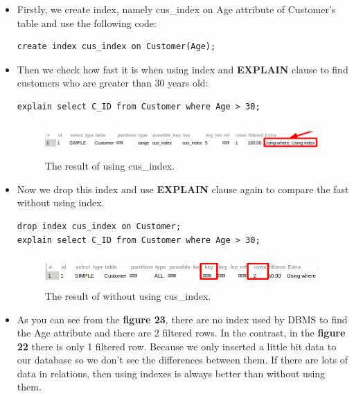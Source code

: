 \documentclass[12pt,a4paper]{article}
\begin{document}
\begin{itemize}
    \item Firstly, we create index, namely cus\_index on Age attribute of Customer's table and use the following code:
    \begin{verbatim}
create index cus_index on Customer(Age);
    \end{verbatim}
    \item Then we check how fast it is when using index and \textbf{EXPLAIN} clause to find customers who are greater than 30 years old:
    \begin{verbatim}
explain select C_ID from Customer where Age > 30; 
    \end{verbatim}
    
    \begin{figure}[H]
        \centering
        \includegraphics[width=5.7in,height=0.5in]{Picture/index1.png}
        \caption{The result of using cus\_index.}
    \end{figure}
    \item Now we drop this index and use \textbf{EXPLAIN} clause again to compare the fast without using index.
    \begin{verbatim}
drop index cus_index on Customer;
explain select C_ID from Customer where Age > 30; 
    \end{verbatim}
    
    \begin{figure}[H]
        \centering
        \includegraphics[width=5.5in,height=0.45in]{Picture/index2.png}
        \caption{The result of without using cus\_index.}
    \end{figure}
    \item As you can see from the \textbf{figure 23}, there are no index used by DBMS to find the Age attribute and there are 2 filtered rows. In the contrast, in the \textbf{figure 22} there is only 1 filtered row. Because we only inserted a little bit data to our database so we don't see the differences between them. If there are lots of data in relations, then using indexes is always better than without using them.
\end{itemize}
\end{document}
